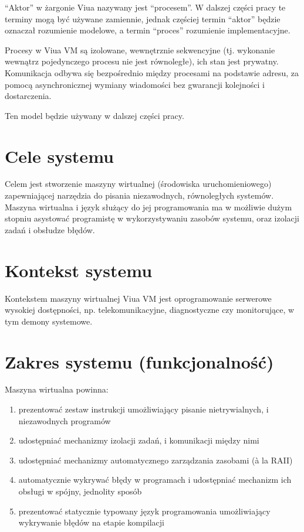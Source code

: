 \documentclass[11pt,oneside,a4paper,titlepage,onecolumn]{article}
\begin{document}
``Aktor'' w żargonie Viua nazywany jest ``procesem''. W dalszej części pracy te terminy mogą być używane
zamiennie, jednak częściej termin ``aktor'' będzie oznaczał rozumienie modelowe, a termin ``proces''
rozumienie implementacyjne.

Procesy w Viua VM są izolowane, wewnętrznie sekwencyjne (tj. wykonanie wewnątrz pojedynczego procesu nie
jest równoległe), ich stan jest prywatny.
Komunikacja odbywa się bezpośrednio między procesami na podstawie adresu, za pomocą asynchronicznej wymiany
wiadomości bez gwarancji kolejności i dostarczenia.

Ten model będzie używany w dalszej części pracy.


\section{Cele systemu}

Celem jest stworzenie maszyny wirtualnej (środowiska uruchomieniowego) zapewniającej narzędzia do
pisania niezawodnych, równoległych systemów. Maszyna wirtualna i język służący do jej programowania
ma w możliwie dużym stopniu asystować programistę w wykorzystywaniu zasobów systemu, oraz
izolacji zadań i obsłudze błędów.

\section{Kontekst systemu}

Kontekstem maszyny wirtualnej Viua VM jest oprogramowanie serwerowe wysokiej dostępności, np.
telekomunikacyjne, diagnostyczne czy monitorujące, w tym demony systemowe.

\section{Zakres systemu (funkcjonalność)}

Maszyna wirtualna powinna:

\begin{enumerate}
    \item prezentować zestaw instrukcji umożliwiający pisanie nietrywialnych, i niezawodnych programów
    \item udostępniać mechanizmy izolacji zadań, i komunikacji między nimi
    \item udostępniać mechanizmy automatycznego zarządzania zasobami (à la RAII)
    \item automatycznie wykrywać błędy w programach i udostępniać mechanizm ich obsługi w spójny, jednolity
        sposób
    \item prezentować statycznie typowany język programowania umożliwiający wykrywanie błędów na etapie
        kompilacji
\end{enumerate}
\end{document}

